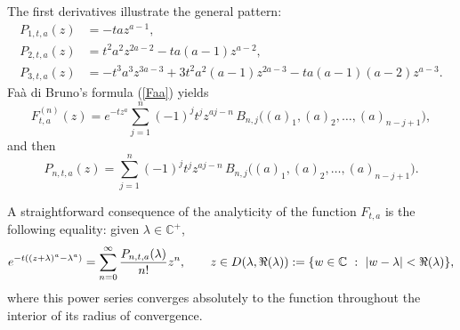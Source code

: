 \documentclass[a4paper,12pt]{amsart}
\def\CC{\mathbb C}
\def\CC{\mathbb C}
\theoremstyle{definition}
\theoremstyle{remark}
\begin{document}
The first derivatives illustrate the general pattern:
\begin{align*}
P_{1,t,a}(z)&=-ta z^{a-1},\\
P_{2,t,a}(z)&=t^2a^2z^{2a-2}-ta(a-1)z^{a-2},\\
P_{3,t,a}(z)&=-t^3a^3z^{3a-3}
+3t^2a^2(a-1)z^{2a-3}
-ta(a-1)(a-2)z^{a-3}.
\end{align*}
Fa\`a di Bruno's formula (\ref{Faa}) yields
\begin{equation}\label{faa}
F^{(n)}_{t,a}(z)
=
e^{-t z^a}
\sum_{j=1}^n
(-1)^j t^j z^{aj-n}
\,
B_{n,j}\!\big( (a)_1, (a)_2, \dots, (a)_{n-j+1} \big),
\end{equation}
and then
$$
P_{n,t,a}(z)=\sum_{j=1}^n
(-1)^j t^j z^{aj-n}
\,
B_{n,j}\!\big( (a)_1, (a)_2, \dots, (a)_{n-j+1} \big).
$$

A straightforward consequence of the  analyticity of the function $F_{t,a}$  is the following equality: given $\lambda\in \CC^+$,
\begin{equation}\label{serie}
e^{-t((z+\lambda)^a-\lambda^a)}=\sum_{n=0}^\infty{P_{n,t,a}(\lambda)\over n!}{z^n}, \qquad z\in D(\lambda, \Re(\lambda)):=\{w\in \CC\,\, :\,\, \vert w-\lambda \vert <\Re(\lambda)\},
\end{equation}
where this  power series converges absolutely to the function throughout the interior of its radius of convergence.
\end{document}
